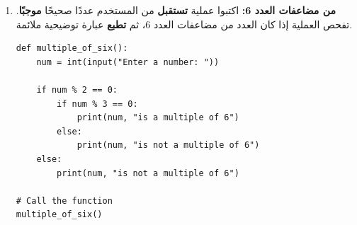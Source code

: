\documentclass[14pt]{extarticle}
\begin{document}
\begin{enumerate}[resume, label=\textbf{تمرين \arabic*:}, wide=0pt, itemsep=2.2em]
\begin{itemize}[itemsep=0.3em]
\item اللغة الإنجليزية: علامة 85 \textbf{فما فوق}.
\item الرياضيات: علامة 80 \textbf{فما فوق}.
\item العلوم: علامة 75 \textbf{فما فوق}.
\end{itemize}

(يُقبل الطالب فقط إذا تحققت الشروط \textbf{الثلاثة}.) \textbf{يجب استخدام الشرط المتداخل.}

\ifwithsols
\begin{boxSolution}
\begin{english}
\begin{verbatim}
def admission():
    english_grade = int(input("Enter grade in English: "))
    math_grade = int(input("Enter grade in math: "))
    sciences_grade = int(input("Enter grade in science: "))

    if english_grade >= 85:
        if math_grade >= 80:
            if sciences_grade >= 75:
                print("Welcome! The student is accepted")
            else:
                print("We apologize, the student is not accepted.")
        else:
            print("We apologize, the student is not accepted.")
    else:
        print("We apologize, the student is not accepted.")

# Call the function
admission()
\end{verbatim}
\end{english}
\end{boxSolution}

\fi
\filbreak

\item \textbf{من مضاعفات العدد 6:} اكتبوا عملية \textbf{تستقبل} من المستخدم عددًا صحيحًا \textbf{موجبًا}. تفحص العملية إذا كان العدد من مضاعفات العدد 6، ثم \textbf{تطبع} عبارة توضيحية ملائمة.

\ifwithsols
\begin{boxSolution}[1]
\begin{english}
\begin{verbatim}
def multiple_of_six():
    num = int(input("Enter a number: "))

    if num % 2 == 0:
        if num % 3 == 0:
            print(num, "is a multiple of 6")
        else:
            print(num, "is not a multiple of 6")
    else:
        print(num, "is not a multiple of 6")

# Call the function
multiple_of_six()
\end{verbatim}
\end{english}
\end{boxSolution}


\end{enumerate}
\end{document}
